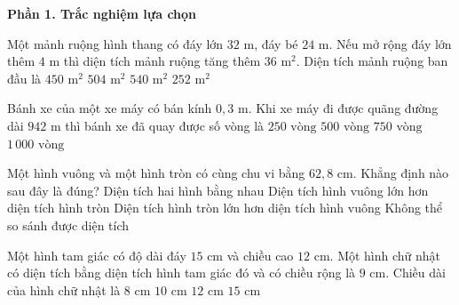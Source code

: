 \textbf{Phần 1. Trắc nghiệm lựa chọn}

\begin{ex} %
Một mảnh ruộng hình thang có đáy lớn $32\text{ m}$, đáy bé $24\text{ m}$. Nếu mở rộng đáy lớn thêm $4\text{ m}$ thì diện tích mảnh ruộng tăng thêm $36\text{ m}^2$. Diện tích mảnh ruộng ban đầu là
\choice
{$450\text{ m}^2$}
{\True $504\text{ m}^2$}
{$540\text{ m}^2$}
{$252\text{ m}^2$}
\end{ex}

\begin{ex} %
Bánh xe của một xe máy có bán kính $0{,}3\text{ m}$. Khi xe máy đi được quãng đường dài $942\text{ m}$ thì bánh xe đã quay được số vòng là
\choice
{$250\text{ vòng}$}
{\True $500\text{ vòng}$}
{$750\text{ vòng}$}
{$1\,000\text{ vòng}$}
\end{ex}

\begin{ex} %
Một hình vuông và một hình tròn có cùng chu vi bằng $62{,}8\text{ cm}$. Khẳng định nào sau đây là đúng?
\choice
{Diện tích hai hình bằng nhau}
{Diện tích hình vuông lớn hơn diện tích hình tròn}
{\True Diện tích hình tròn lớn hơn diện tích hình vuông}
{Không thể so sánh được diện tích}
\end{ex}

\begin{ex} %
Một hình tam giác có độ dài đáy $15\text{ cm}$ và chiều cao $12\text{ cm}$. Một hình chữ nhật có diện tích bằng diện tích hình tam giác đó và có chiều rộng là $9\text{ cm}$. Chiều dài của hình chữ nhật là
\choice
{$8\text{ cm}$}
{\True $10\text{ cm}$}
{$12\text{ cm}$}
{$15\text{ cm}$}
\end{ex}

